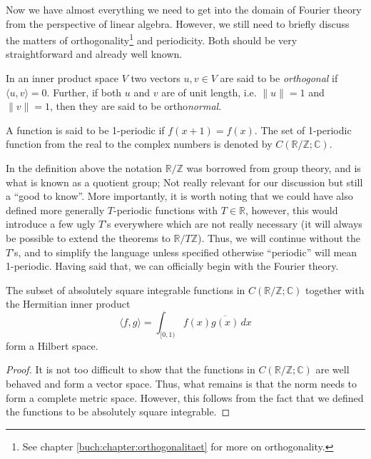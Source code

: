 Now we have almost everything we need to get into the domain of Fourier theory
from the perspective of linear algebra. However, we still need to briefly
discuss the matters of orthogonality\footnote{See chapter
\ref{buch:chapter:orthogonalitaet} for more on orthogonality.} and
periodicity. Both should be very straightforward and already well known.

\begin{definition}
  \label{kugel:def:orthogonality}
  In an inner product space \(V\) two vectors \(u, v \in V\) are said to be
  \emph{orthogonal} if \(\langle u, v \rangle = 0\). Further, if both \(u\)
  and \(v\) are of unit length, i.e. \(\| u \| = 1\) and \(\| v \| = 1\), then
  they are said to be ortho\emph{normal}.
\end{definition}

\begin{definition}
  A function is said to be 1-periodic if \(f(x + 1) = f(x)\). The set of
  1-periodic function from the real to the complex
  numbers is denoted by \(C(\mathbb{R}/\mathbb{Z}; \mathbb{C})\).
\end{definition}

In the definition above the notation \(\mathbb{R}/\mathbb{Z}\) was borrowed
from group theory, and is what is known as a quotient group; Not really
relevant for our discussion but still a ``good to know''. More importantly, it
is worth noting that we could have also defined more generally \(T\)-periodic
functions with \(T\in\mathbb{R}\), however, this would introduce a few ugly
\(T\)'s everywhere which are not really necessary (it will always be possible
to extend the theorems to \(\mathbb{R} / T\mathbb{Z}\)). Thus, we will
continue without the \(T\)'s, and to simplify the language unless specified
otherwise ``periodic'' will mean 1-periodic. Having said that, we can
officially begin with the Fourier theory.

\begin{lemma}
  \label{kugel:thm:sqint-hilbert}
  The subset of absolutely square integrable functions in
  \(C(\mathbb{R}/\mathbb{Z}; \mathbb{C})\) together with the Hermitian inner
  product
  \[
    \langle f, g \rangle = \int_{[0, 1)} f(x) \overline{g(x)} \, dx
  \]
  form a Hilbert space.
\end{lemma}
\begin{proof}
  It is not too difficult to show that the functions in \(C(\mathbb{R} /
  \mathbb{Z}; \mathbb{C})\) are well behaved and form a vector space. Thus,
  what remains is that the norm needs to form a complete metric space.
  However, this follows from the fact that we defined the functions to be
  absolutely square integrable.
\end{proof}


